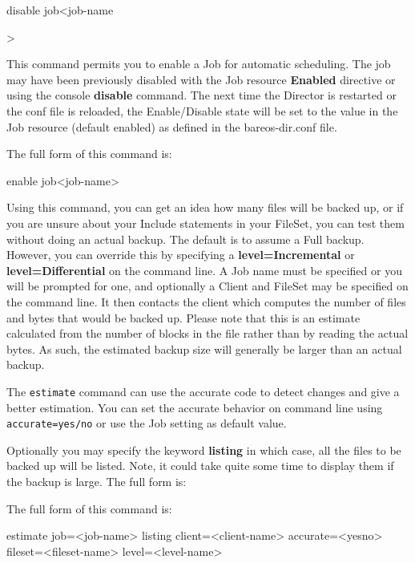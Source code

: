 \begin{description}
disable job{\textless}job-name{\textgreater

\item [enable]
  This command permits you to enable a Job for automatic scheduling.
  The job may have been previously disabled with the Job resource
  {\bf Enabled} directive or using the console {\bf disable} command.
  The next time the Director is restarted or the conf file is reloaded,
  the Enable/Disable state will be set to the value in the Job resource
  (default enabled) as defined in the bareos-dir.conf file.

   The full form of this command is:

enable job{\textless}job-name{\textgreater}

\label{estimate}
\item [estimate]
   Using this command, you can get an idea how many files will be backed
   up, or if you are unsure about your Include statements in your FileSet,
   you can test them without doing an actual backup.  The default is to
   assume a Full backup.  However, you can override this by specifying a
   {\bf level=Incremental} or {\bf level=Differential} on the command line.
   A Job name must be specified or you will be prompted for one, and
   optionally a Client and FileSet may be specified on the command line.
   It then contacts the client which computes the number of files and bytes
   that would be backed up.  Please note that this is an estimate
   calculated from the number of blocks in the file rather than by reading
   the actual bytes.  As such, the estimated backup size will generally be
   larger than an actual backup.

   The \texttt{estimate} command can use the accurate code to detect changes
   and give a better estimation. You can set the accurate behavior on command
   line using \texttt{accurate=yes/no} or use the Job setting as default value.

   Optionally you may specify the keyword {\bf listing} in  which case, all the
   files to be backed up will be listed.  Note, it could take quite some time to
   display them if the  backup is large. The full form is:

   The full form of this command is:

estimate job={\textless}job-name{\textgreater} listing client={\textless}client-name{\textgreater}
  accurate={\textless}yes{\textbar}no{\textgreater} fileset={\textless}fileset-name{\textgreater}
  level={\textless}level-name{\textgreater}

}
\end{description}
